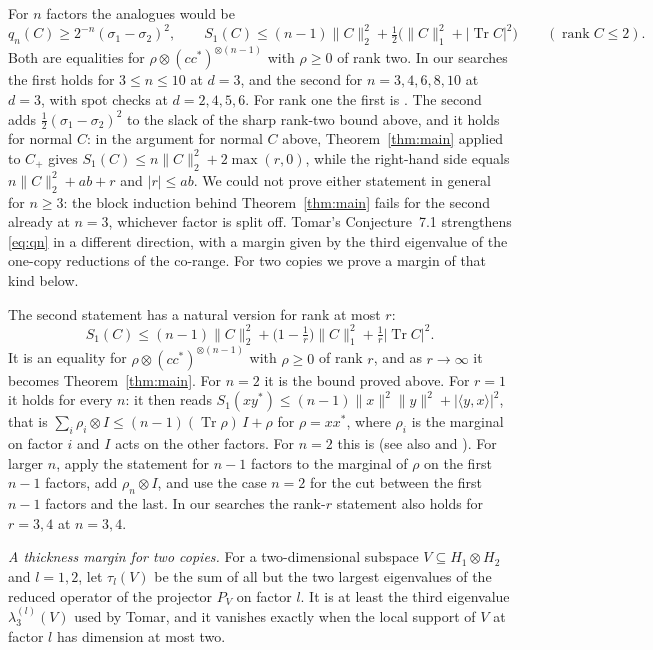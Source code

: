 \documentclass[11pt]{article}
\theoremstyle{remark}
\newcommand{\Tr}{\operatorname{Tr}}
\newcommand{\norm}[1]{\lVert #1\rVert}
\begin{document}
For $n$ factors the analogues would be
\[
q_n(C)\ge2^{-n}(\sigma_1-\sigma_2)^2,\qquad
S_1(C)\le(n-1)\norm{C}_2^2+\tfrac12\big(\norm{C}_1^2+|\Tr C|^2\big)\qquad(\operatorname{rank}C\le2).
\]
Both are equalities for $\rho\otimes(cc^*)^{\otimes(n-1)}$ with $\rho\ge0$ of rank two. In our searches the first holds
for $3\le n\le10$ at $d=3$, and the second for $n=3,4,6,8,10$ at $d=3$, with spot checks at $d=2,4,5,6$. For rank one the
first is \cite[Prop.~8]{SongChen}. The second adds $\tfrac12(\sigma_1-\sigma_2)^2$ to the slack of the sharp rank-two
bound above, and it holds for normal $C$: in the argument for normal $C$ above, Theorem~\ref{thm:main} applied to
$C_+$ gives $S_1(C)\le n\norm{C}_2^2+2\max(r,0)$, while the right-hand side equals $n\norm{C}_2^2+ab+r$ and $|r|\le ab$.
We could not prove either statement in general for $n\ge3$: the block induction behind Theorem~\ref{thm:main} fails for
the second already at $n=3$, whichever factor is split off. Tomar's Conjecture~7.1 \cite{Tomar2} strengthens
\eqref{eq:qn} in a different direction, with a margin given by the third eigenvalue of the one-copy reductions of the
co-range. For two copies we prove a margin of that kind below.

The second statement has a natural version for rank at most $r$:
\[
S_1(C)\le(n-1)\norm{C}_2^2+\big(1-\tfrac1r\big)\norm{C}_1^2+\tfrac1r|\Tr C|^2 .
\]
It is an equality for $\rho\otimes(cc^*)^{\otimes(n-1)}$ with $\rho\ge0$ of rank $r$, and as $r\to\infty$ it becomes
Theorem~\ref{thm:main}. For $n=2$ it is the bound proved above. For $r=1$ it holds for every $n$: it then reads
$S_1(xy^*)\le(n-1)\norm{x}^2\norm{y}^2+|\langle y,x\rangle|^2$, that is
$\sum_i\rho_i\otimes I\le(n-1)(\Tr\rho)\,I+\rho$ for $\rho=xx^*$, where $\rho_i$ is the marginal on factor $i$ and $I$
acts on the other factors. For $n=2$ this is \cite[Prop.~1]{CR23} (see also \cite[Prop.~11]{CRW} and \cite[Lemma~6.4]{FHPV}). For larger $n$, apply the statement for $n-1$
factors to the marginal of $\rho$ on the first $n-1$ factors, add $\rho_n\otimes I$, and use the case $n=2$ for the cut
between the first $n-1$ factors and the last. In our searches the rank-$r$ statement also holds for $r=3,4$ at
$n=3,4$.

\emph{A thickness margin for two copies.} For a two-dimensional subspace $V\subseteq H_1\otimes H_2$ and $l=1,2$, let
$\tau_l(V)$ be the sum of all but the two largest eigenvalues of the reduced operator of the projector $P_V$ on factor
$l$. It is at least the third eigenvalue $\lambda_3^{(l)}(V)$ used by Tomar, and it vanishes exactly when the local
support of $V$ at factor $l$ has dimension at most two.
\end{document}
